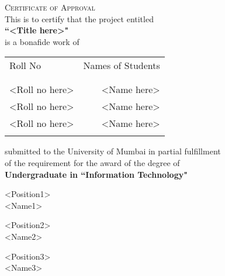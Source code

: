 \newpage
\thispagestyle{empty}

\begin{center}
    \Large \textsc {Certificate of Approval}\\[0.5cm]
    \normalsize This is to certify that the project entitled\\[0.5cm]
    \large \textbf {``<Title here>"}\\[0.5cm]
    \normalsize is a bonafide work of
\end{center}

\begin{table}[h]
    \centering
    \begin{tabular}{lr}
        Roll No        & Names of Students \\ \\ \hline
        \\
        <Roll no here> & <Name here>       \\
        <Roll no here> & <Name here>       \\
        <Roll no here> & <Name here>       \\ \\ \hline
    \end{tabular}
\end{table}

\begin{center}
    submitted to the University of Mumbai in partial fulfillment\\
    of the requirement for the award of the degree of\\[0.5cm]
    \large \textbf {Undergraduate in ``Information Technology"}\\[1.5cm]
\end{center}

\begin{center}
    \begin{minipage}[b]{0.33333\textwidth}
        \raggedright
        <Position1>\\
        <Name1>
    \end{minipage}%
    \begin{minipage}[b]{0.33333\textwidth}
        \centering
        <Position2>\\
        <Name2>
    \end{minipage}%
    \begin{minipage}[b]{0.33333\textwidth}
        \raggedleft
        <Position3>\\
        <Name3>
    \end{minipage}
\end{center}